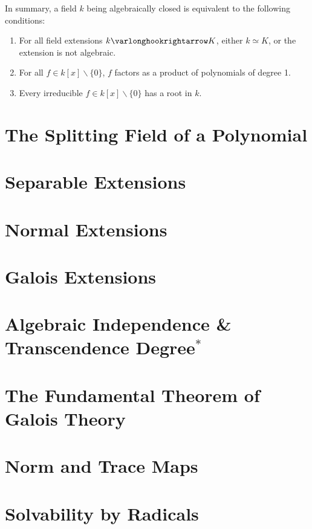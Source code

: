 \documentclass{article}
\begin{document}
\textstart
In summary, a field $k$ being algebraically closed is equivalent to the following conditions:
\begin{enumerate}[label=\arabic*)]
    \item For all field extensions $k \ext K$, either $k \simeq K$, or the extension is not algebraic. 
    \item For all $f \in k[x] \smallsetminus \{0\}$, $f$ factors as a product of polynomials of degree 1.
    \item Every irreducible $f \in k[x] \smallsetminus \{0\}$ has a root in $k$. 
\end{enumerate}

\section{The Splitting Field of a Polynomial}

\section{Separable Extensions}

\section{Normal Extensions}

\section{Galois Extensions}

\section{Algebraic Independence \& Transcendence Degree$^{\ast}$}

\section{The Fundamental Theorem of Galois Theory}

\section{Norm and Trace Maps}

\section{Solvability by Radicals}
\end{document}

